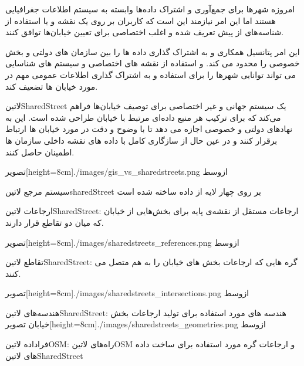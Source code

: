 امروزه شهرها برای جمع‌آوری و اشتراک داده‌ها وابسته به سیستم اطلاعات جغرافیایی هستند اما این امر نیازمند این است که کاربران بر روی یک نقشه و یا استفاده از شناسه‌های از پیش تعریف شده و اغلب اختصاصی برای تعیین خیابان‌ها توافق کنند.

این امر پتانسیل همکاری و به اشتراک گذاری داده ها را بین سازمان های دولتی و بخش خصوصی را محدود می کند. و استفاده از نقشه های اختصاصی و سیستم های شناسایی می تواند توانایی شهرها را برای استفاده و به اشتراک گذاری اطلاعات عمومی مهم در مورد خیابان ها تضعیف کند.

‌لاتین{SharedStreet} یک سیستم جهانی و غیر اختصاصی برای توصیف خیابان‌ها فراهم می‌کند که برای ترکیب هر منبع داده‌ای مرتبط با خیابان طراحی شده است. این به نهادهای دولتی و خصوصی اجازه می دهد تا با وضوح و دقت در مورد خیابان ها ارتباط برقرار کنند و در عین حال از سازگاری کامل با داده های نقشه داخلی سازمان ها اطمینان حاصل کنند.


  ‌تصویر[height=8cm]{./images/gis_vs_sharedstreets.png}
  ‌ازوسط


 سیستم مرجع ‌لاتین{sharedStreet} بر روی چهار لایه از داده ساخته شده است


 ارجاعات ‌لاتین{SharedStreet}: ارجاعات مستقل از نقشه‌ی پایه برای بخش‌هایی از خیابان که میان دو تقاطع قرار دارند.


  ‌تصویر[height=8cm]{./images/sharedstreets_references.png}
  ‌ازوسط


 تقاطع ‌لاتین{SharedStreet}: گره هایی که ارجاعات بخش های خیابان را به هم متصل می کنند.


  ‌تصویر[height=8cm]{./images/sharedstreets_intersections.png}
  ‌ازوسط


 هندسه‌های ‌لاتین{SharedStreet}: هندسه های مورد استفاده برای تولید ارجاعات بخش خیابان
  ‌تصویر[height=8cm]{./images/sharedstreets_geometries.png}
  ‌ازوسط


 فراداده ‌لاتین{OSM}: راه‌های ‌لاتین{OSM} و ارجاعات گره مورد استفاده برای ساخت داده های ‌لاتین{SharedStreet}

